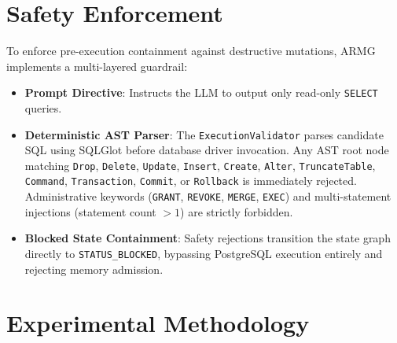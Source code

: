\section{Safety Enforcement}
To enforce pre-execution containment against destructive mutations, ARMG implements a multi-layered guardrail:
\begin{itemize}
    \item \textbf{Prompt Directive}: Instructs the LLM to output only read-only \texttt{SELECT} queries.
    \item \textbf{Deterministic AST Parser}: The \texttt{Execution\-Validator} parses candidate SQL using SQLGlot \cite{mao2023sqlglot} before database driver invocation. Any AST root node matching \texttt{Drop}, \allowbreak\texttt{Delete}, \allowbreak\texttt{Update}, \allowbreak\texttt{Insert}, \allowbreak\texttt{Create}, \allowbreak\texttt{Alter}, \allowbreak\texttt{Truncate\-Table}, \allowbreak\texttt{Command}, \allowbreak\texttt{Transaction}, \allowbreak\texttt{Commit}, or \allowbreak\texttt{Rollback} is immediately rejected. Administrative keywords (\texttt{GRANT}, \allowbreak\texttt{REVOKE}, \allowbreak\texttt{MERGE}, \allowbreak\texttt{EXEC}) and multi-statement injections (statement count $> 1$) are strictly forbidden.
    \item \textbf{Blocked State Containment}: Safety rejections transition the state graph directly to \texttt{STATUS\_\allowbreak BLOCKED}, bypassing PostgreSQL execution entirely and rejecting memory admission.
\end{itemize}

\section{Experimental Methodology}

